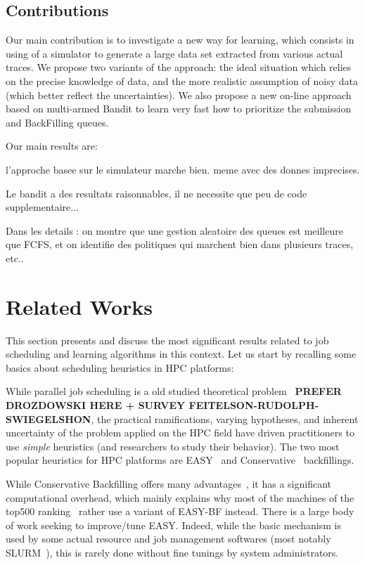 \documentclass[sigconf]{acmart}
\begin{document}

\subsection{Contributions}

Our main contribution is to investigate a new way for learning, which 
consists in using of a simulator to generate a large data set extracted 
from various actual traces.
We propose two variants of the approach: the ideal situation which 
relies on the  precise knowledge of data, and the more realistic 
assumption of noisy data (which better reflect the uncertainties).
We also propose a new on-line approach based on multi-armed Bandit to 
learn very fast how to prioritize the submission and BackFilling queues.
\bigskip

Our main results are:

l'approche basee sur le simulateur marche bien. meme avec des donnes 
imprecises.

Le bandit a des resultats raisonnables, il ne necessite que peu de code 
supplementaire...

Dans les details :
on montre que une gestion aleatoire des queues est meilleure que FCFS, 
et on identifie des politiques qui marchent bien dans plusieurs traces, 
etc..


\section{Related Works}
\label{sec:rw}

This section presents and discuss the most significant results related 
to job scheduling and learning algorithms in this context.
Let us start by recalling some basics about scheduling heuristics in HPC 
platforms:

While parallel job scheduling is a old studied theoretical
problem~\cite{leung2004handbook} \textbf{PREFER DROZDOWSKI HERE + SURVEY 
FEITELSON-RUDOLPH-SWIEGELSHON}, the practical ramifications, varying
hypotheses, and inherent uncertainty of the problem applied on the HPC 
field have driven
practitioners to use \textit{simple} heuristics (and researchers to 
study their behavior).
The two most popular heuristics for HPC platforms are EASY~\cite{easy} and
Conservative~\cite{Mu'alem:2001:UPW:380314.380315} backfillings.

While Conservative Backfilling offers many advantages~\cite{bfchar}, it 
has a
significant computational overhead, which mainly explains why most of 
the machines
of the top500 ranking~\cite{top500} rather use a variant of EASY-BF 
instead.
There is a large body of work seeking to improve/tune EASY. Indeed, 
while the
basic mechanism is used by some actual resource and job management 
softwares (most notably
SLURM~\cite{SLURMdocSCHED}), this is rarely done without fine tunings by 
system
administrators.
\end{document}
